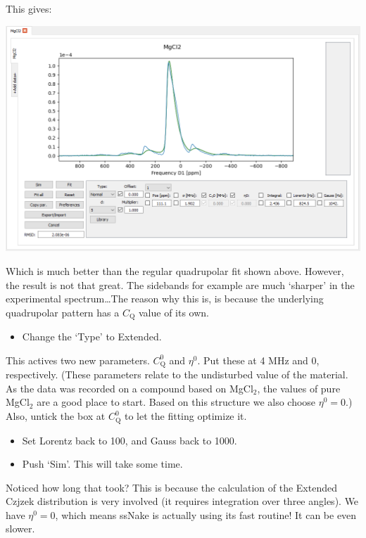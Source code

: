 \documentclass[11pt,a4paper]{article}
\begin{document}
This gives:
\begin{center}
\includegraphics[width=0.8\linewidth]{Figs/fig8.PNG}
\end{center}
Which is much better than the regular quadrupolar fit shown above. However, the result is not that great. The sidebands for example are much `sharper' in the experimental spectrum\ldots The reason why this is, is because the underlying quadrupolar pattern has a $C_\text{Q}$ value of its own.
\begin{itemize}
  \item Change the `Type' to Extended.
\end{itemize}
This actives two new parameters. $C_\text{Q}^0$ and $\eta^0$. Put these at 4 MHz and 0, respectively. (These parameters relate to the undisturbed value of the material. As the data was recorded on a compound based on MgCl$_2$, the values of pure MgCl$_2$ are a good place to start. Based on this structure we also choose $\eta^0=0$.) Also, untick the box at $C_\text{Q}^0$ to let the fitting optimize it.
\begin{itemize}
  \item Set Lorentz back to 100, and Gauss back to 1000.
  \item Push `Sim'. This will take some time.
\end{itemize}
Noticed how long that took? This is because the calculation of the Extended Czjzek distribution is very involved (it requires integration over three angles). We have $\eta^0=0$, which means ssNake is actually using its fast routine! It can be even slower.
\end{document}
